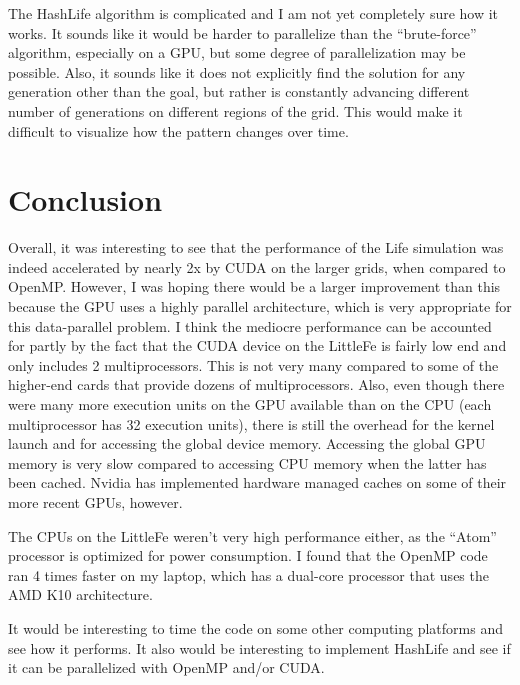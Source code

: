 \documentclass[letterpaper,12pt]{article}
\begin{document}
The HashLife algorithm is complicated and I am not yet completely sure how it
works.  It sounds like it would be harder to parallelize than the
``brute-force'' algorithm, especially on a GPU, but some degree of
parallelization may be possible.  Also, it sounds like it does not explicitly
find the solution for any generation other than the goal, but rather is
constantly advancing different number of generations on different regions of the
grid.  This would make it difficult to visualize how the pattern changes over
time.

\section{Conclusion}

Overall, it was interesting to see that the performance of the Life simulation
was indeed accelerated by nearly 2x by CUDA on the larger grids, when compared
to OpenMP.  However, I was hoping there would be a larger improvement than this
because the GPU uses a highly parallel architecture, which is very appropriate
for this data-parallel problem.  I think the mediocre performance can be
accounted for partly by the fact that the CUDA device on the LittleFe is fairly
low end and only includes 2 multiprocessors.  This is not very many compared to
some of the higher-end cards that provide dozens of multiprocessors.  Also, even
though there were many more execution units on the GPU available than on the CPU
(each multiprocessor has 32 execution units), there is still the overhead for
the kernel launch and for accessing the global device memory.  Accessing the
global GPU memory is very slow compared to accessing CPU memory when the latter
has been cached.  Nvidia has implemented hardware managed caches on some of
their more recent GPUs, however.\cite{fermi}

The CPUs on the LittleFe weren't very high performance either, as the ``Atom''
processor is optimized for power consumption.  I found that the OpenMP code ran
4 times faster on my laptop, which has a dual-core processor that uses the AMD
K10 architecture. 

It would be interesting to time the code on some other computing platforms and
see how it performs.  It also would be interesting to implement HashLife and see
if it can be parallelized with OpenMP and/or CUDA.



\end{document}
